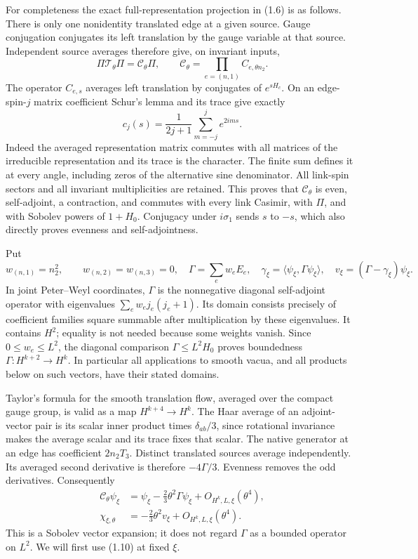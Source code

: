 \documentclass[
  11pt,
]{article}
\begin{document}
For completeness the exact full-representation projection in (1.6) is as
follows. There is only one nonidentity translated edge at a given
source. Gauge conjugation conjugates its left translation by the gauge
variable at that source. Independent source averages therefore give, on
invariant inputs, \[
 \Pi\mathcal T_\theta\Pi=\mathcal C_\theta\Pi,
 \qquad \mathcal C_\theta=\prod_{e=(n,1)}C_{e,\theta n_2}.
\tag{1.7}
\] The operator \(C_{e,s}\) averages left translation by conjugates of
\(e^{sH_c}\). On an edge-spin-\(j\) matrix coefficient Schur's lemma and
its trace give exactly \[
 c_j(s)=\frac1{2j+1}\sum_{m=-j}^j e^{2ims}.
\tag{1.8}
\] Indeed the averaged representation matrix commutes with all matrices
of the irreducible representation and its trace is the character. The
finite sum defines it at every angle, including zeros of the alternative
sine denominator. All link-spin sectors and all invariant multiplicities
are retained. This proves that \(\mathcal C_\theta\) is even,
self-adjoint, a contraction, and commutes with every link Casimir, with
\(\Pi\), and with Sobolev powers of \(1+H_0\). Conjugacy under
\(i\sigma_1\) sends \(s\) to \(-s\), which also directly proves evenness
and self-adjointness.

Put \[
 w_{(n,1)}=n_2^2,\qquad w_{(n,2)}=w_{(n,3)}=0,
 \quad \Gamma=\sum_e w_eE_e,
 \quad\gamma_\xi=\langle\psi_\xi,\Gamma\psi_\xi\rangle,
 \quad v_\xi=(\Gamma-\gamma_\xi)\psi_\xi.
\tag{1.9}
\] In joint Peter--Weyl coordinates, \(\Gamma\) is the nonnegative
diagonal self-adjoint operator with eigenvalues \(\sum_ew_ej_e(j_e+1)\).
Its domain consists precisely of coefficient families square summable
after multiplication by these eigenvalues. It contains \(H^2\); equality
is not needed because some weights vanish. Since \(0\leq w_e\leq L^2\),
the diagonal comparison \(\Gamma\leq L^2H_0\) proves boundedness
\(\Gamma:H^{k+2}\to H^k\). In particular all applications to smooth
vacua, and all products below on such vectors, have their stated
domains.

Taylor's formula for the smooth translation flow, averaged over the
compact gauge group, is valid as a map \(H^{k+4}\to H^k\). The Haar
average of an adjoint-vector pair is its scalar inner product times
\(\delta_{ab}/3\), since rotational invariance makes the average scalar
and its trace fixes that scalar. The native generator at an edge has
coefficient \(2n_2T_3\). Distinct translated sources average
independently. Its averaged second derivative is therefore
\(-4\Gamma/3\). Evenness removes the odd derivatives. Consequently \[
\begin{split}
 \mathcal C_\theta\psi_\xi
  &=\psi_\xi-\frac23\theta^2\Gamma\psi_\xi+O_{H^k,L,\xi}(\theta^4),\\
 \chi_{\xi,\theta}
  &=-\frac23\theta^2v_\xi+O_{H^k,L,\xi}(\theta^4).
\end{split}
\tag{1.10}
\] This is a Sobolev vector expansion; it does not regard \(\Gamma\) as
a bounded operator on \(L^2\). We will first use (1.10) at fixed
\(\xi\).
\end{document}
